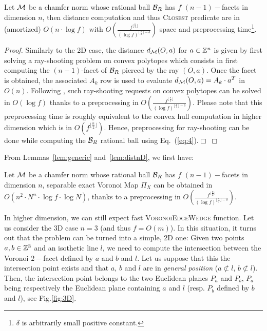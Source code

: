 \documentclass{llncs}
\begin{document}
\begin{lemma}
\label{lem:distnD}
   Let $\mathcal{M}$ be a chamfer norm whose rational ball $\mathcal{B}_R$ has $f$
   $(n-1)-$facets in dimension $n$, then distance computation and thus
   \textsc{Closest} predicate are in (amortized) $O(n\cdot\log{f})$ with
   $O\left (\frac{f^{\lfloor \frac{n}{2}\rfloor}}{(\log{ f})^{\lfloor
       \frac{n}{2}\rfloor-\delta}}\right)$ space and preprocessing
   time\footnote{$\delta$ is arbitrarily small positive constant.}.
\end{lemma}
\begin{proof}
 Similarly to the 2D case, the distance $d_{\mathcal{M}}(O,a)$ for $a\in{\mathbb{Z}}^n$ is
 given by first solving a ray-shooting problem on convex polytopes
 which consists in first computing the $(n-1)$-facet of $\mathcal{B}_R$ pierced by the
 ray $(O,a)$. Once the facet is obtained, the associated $A_k$ row is
 used to evaluate
   $d_{\mathcal{M}}(O,a) = A_k\cdot a^T$
in $O(n)$.  Following \cite{DBLP:journals/dcg/MatousekS93}, such
ray-shooting requests on convex polytopes can be solved in
$O(\log{f})$ thanks to a preprocessing in $O\left (\frac{f^{\lfloor
    \frac{n}{2}\rfloor}}{(\log{ f})^{\lfloor
    \frac{n}{2}\rfloor-\delta}}\right)$. Please note that this
preprocessing time is roughly equivalent to the convex hull
computation in higher dimension which is in $O(f^{\lfloor
  \frac{n}{2}\rfloor})$. Hence, preprocessing for ray-shooting can be
done while computing the $\mathcal{B}_R$ rational ball using
Eq.~(\ref{eq:4}).$\Box$
\end{proof}

From Lemmas~\ref{lem:generic} and~\ref{lem:distnD}, we first have:
\begin{corollary}
\label{coro2}
   Let $\mathcal{M}$ be a chamfer norm whose rational ball $\mathcal{B}_R$ has $f$
   $(n-1)-$facets in dimension $n$, separable exact Voronoi Map
   $\Pi_X$ can be obtained in     $O(n^2\cdot N^n\cdot
   \log{f}\cdot\log{N})$,
thanks to a preprocessing in $O\left (\frac{f^{\lfloor
    \frac{n}{2}\rfloor}}{(\log{ f})^{\lfloor
    \frac{n}{2}\rfloor-\delta}}\right)$.
\end{corollary}


In higher dimension, we can still expect fast
\textsc{VoronoiEdgeWedge} function. Let us consider the 3D case
$n=3$ (and thus $f=O(m)$). In this situation, it turns out that the problem can be turned
into a simple, 2D one: Given two points $a,b\in{\mathbb{Z}}^3$ and an isothetic
line $l$, we need to compute the intersection between the Voronoi
$2-$facet defined by $a$ and $b$ and $l$. Let us suppose that this the
intersection point exists and that $a$, $b$ and $l$ are in
\emph{general position} ($a\not\subset l$, $b\not\subset l$).  Then,
the intersection point belongs to the two Euclidean planes $P_a$ and
$P_b$, $P_a$ being respectively the Euclidean plane containing $a$ and
$l$ (resp. $P_b$ defined by $b$ and $l$), see Fig.\ref{fig:3D}.
\end{document}

